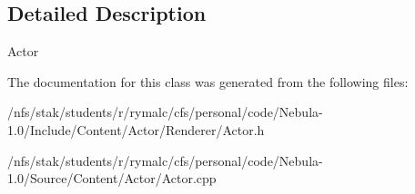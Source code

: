 \subsection{Detailed Description}
Actor 

The documentation for this class was generated from the following files:\begin{DoxyCompactItemize}
\item 
/nfs/stak/students/r/rymalc/cfs/personal/code/Nebula-\/1.0/Include/Content/Actor/Renderer/Actor.h\item 
/nfs/stak/students/r/rymalc/cfs/personal/code/Nebula-\/1.0/Source/Content/Actor/Actor.cpp\end{DoxyCompactItemize}
